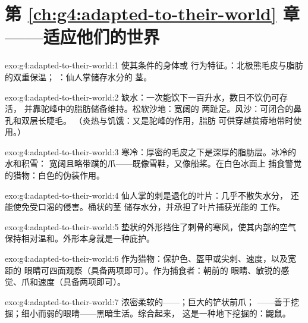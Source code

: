 \section*{第 \ref{ch:g4:adapted-to-their-world} 章——适应他们的世界}

\begin{solution}{exo:g4:adapted-to-their-world:1}
使其条件的身体或
行为特征。：北极熊毛皮与脂肪的双重保温；
：仙人掌储存水分的
茎。
\end{solution}

\begin{solution}{exo:g4:adapted-to-their-world:2}
缺水：一次能饮下一百升水，数日不饮仍可存活，
并靠驼峰中的脂肪储备维持。松软沙地：宽阔的
两趾足。风沙：可闭合的鼻孔和双层长睫毛。
（炎热与饥饿：又是驼峰的作用，脂肪
可供穿越贫瘠地带时使用。）
\end{solution}

\begin{solution}{exo:g4:adapted-to-their-world:3}
寒冷：厚密的毛皮之下是深厚的脂肪层。冰冷的水和积雪：
宽阔且略带蹼的爪——既像雪鞋，又像船桨。在白色冰面上
捕食警觉的猎物：白色的伪装作用。
\end{solution}

\begin{solution}{exo:g4:adapted-to-their-world:4}
仙人掌的刺是退化的叶片：几乎不散失水分，
还能使免受口渴的侵害。桶状的茎
储存水分，并承担了叶片捕获光能的
工作。
\end{solution}

\begin{solution}{exo:g4:adapted-to-their-world:5}
垫状的外形挡住了刺骨的寒风，使其内部的空气
保持相对温和。外形本身就是一种庇护。
\end{solution}

\begin{solution}{exo:g4:adapted-to-their-world:6}
作为猎物：保护色、盔甲或尖刺、速度，以及宽距的
眼睛可四面观察（具备两项即可）。作为捕食者：朝前的
眼睛、敏锐的感觉、爪和速度（具备两项即可）。
\end{solution}

\begin{solution}{exo:g4:adapted-to-their-world:7}
浓密柔软的——；巨大的铲状前爪；
——善于挖掘；细小而弱的眼睛——黑暗生活。综合起来，
这是一种地下挖掘的：鼹鼠。
\end{solution}

